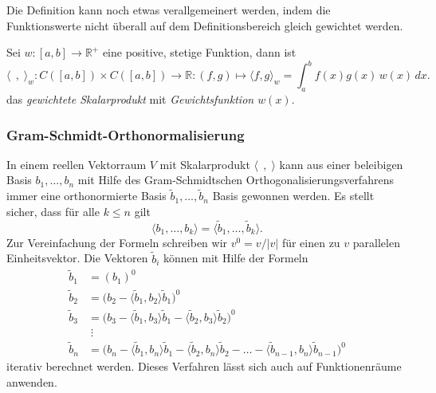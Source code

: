 Die Definition kann noch etwas verallgemeinert werden, indem 
die Funktionswerte nicht überall auf dem Definitionsbereich 
gleich gewichtet werden. 

\begin{definition}
Sei $w\colon [a,b]\to \mathbb{R}^+$ eine positive, stetige Funktion,
dann ist
\[
\langle\;\,,\;\rangle_w
\colon
C([a,b]) \times C([a,b]) \to \mathbb{R}
:
(f,g) \mapsto \langle f,g\rangle_w = \int_a^b f(x)g(x)\,w(x)\,dx.
\]
das {\em gewichtete Skalarprodukt} mit {\em Gewichtsfunktion $w(x)$}.
\end{definition}

\subsubsection{Gram-Schmidt-Orthonormalisierung}
In einem reellen Vektorraum $V$ mit Skalarprodukt $\langle\;\,,\;\rangle$
kann aus einer beleibigen Basis $b_1,\dots,b_n$ mit Hilfe des 
Gram-Schmidtschen Orthogonalisierungsverfahrens immer eine
orthonormierte Basis $\tilde{b}_1,\dots,\tilde{b}_n$ Basis
gewonnen werden.
Es stellt sicher, dass für alle $k\le n$ gilt
\[
\langle b_1,\dots,b_k\rangle
=
\langle \tilde{b}_1,\dots,\tilde{b}_k\rangle.
\]
Zur Vereinfachung der Formeln schreiben wir $v^0=v/|v|$ für einen zu
$v$ parallelen Einheitsvektor.
Die Vektoren $\tilde{b}_i$ können mit Hilfe der Formeln
\begin{align*}
\tilde{b}_1
&=
(b_1)^0
\\
\tilde{b}_2
&=
\bigl(
b_2
-
\langle \tilde{b}_1,b_2\rangle \tilde{b}_1
\bigr)^0
\\
\tilde{b}_3
&=
\bigl(
b_3
-
\langle \tilde{b}_1,b_3\rangle \tilde{b}_1
-
\langle \tilde{b}_2,b_3\rangle \tilde{b}_2
\bigr)^0
\\
&\;\vdots
\\
\tilde{b}_n
&=
\bigl(
b_n
-
\langle \tilde{b}_1,b_n\rangle \tilde{b}_1
-
\langle \tilde{b}_2,b_n\rangle \tilde{b}_2
-\dots
-
\langle \tilde{b}_{n-1},b_n\rangle \tilde{b}_{n-1}
\bigr)^0
\end{align*}
iterativ berechnet werden.
Dieses Verfahren lässt sich auch auf Funktionenräume anwenden.


